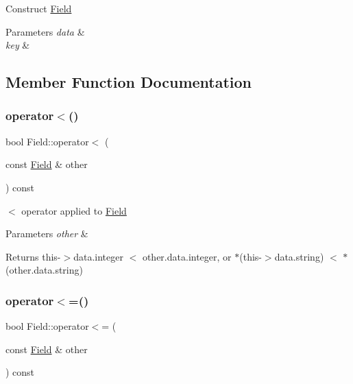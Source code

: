 Construct \hyperlink{struct_field}{Field}


\begin{DoxyParams}{Parameters}
{\em data} & \\
\hline
{\em key} & \\
\hline
\end{DoxyParams}


\subsection{Member Function Documentation}
\mbox{\label{struct_field_a646b48849ac9d8221aa5f3e57cd8b72f}} 
\subsubsection{\texorpdfstring{operator$<$()}{operator<()}}
{\footnotesize\ttfamily bool Field\+::operator$<$ (\begin{DoxyParamCaption}\item[{const \hyperlink{struct_field}{Field} \&}]{other }\end{DoxyParamCaption}) const}

$<$ operator applied to \hyperlink{struct_field}{Field}


\begin{DoxyParams}{Parameters}
{\em other} & \\
\hline
\end{DoxyParams}
\begin{DoxyReturn}{Returns}
this-\/$>$data.\+integer $<$ other.\+data.\+integer, or $\ast$(this-\/$>$data.\+string) $<$ $\ast$(other.\+data.\+string) 
\end{DoxyReturn}
\mbox{\label{struct_field_a3654ee1d9ec7f5c65eb48c4e37e2e309}} 
\subsubsection{\texorpdfstring{operator$<$=()}{operator<=()}}
{\footnotesize\ttfamily bool Field\+::operator$<$= (\begin{DoxyParamCaption}\item[{const \hyperlink{struct_field}{Field} \&}]{other }\end{DoxyParamCaption}) const}

